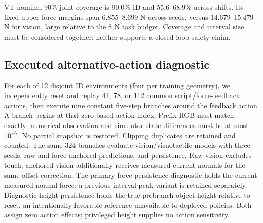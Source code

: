 \documentclass[letterpaper,10pt,conference]{ieeeconf}
\begin{document}
VT nominal-90\% joint coverage is 90.0\% ID and 55.6--68.9\% across shifts. Its fixed upper force margins span 6.855--8.699 N across seeds, versus 14.679--15.479 N for vision, large relative to the 8 N task budget. Coverage and interval size must be considered together; neither supports a closed-loop safety claim.


\subsection{Executed alternative-action diagnostic}
For each of 12 disjoint ID environments (four per training geometry), we
independently reset and replay
44, 78, or 112 common script/force-feedback actions, then execute nine
constant five-step branches around the feedback action. A branch begins
at that zero-based action index. Prefix RGB must match exactly; numerical
observation and simulator-state differences must be at most $10^{-7}$.
No partial snapshot is restored. Clipping duplicates are retained and counted.
The same 324 branches evaluate vision/visuotactile models with three
seeds, raw and force-anchored predictions, and persistence.
Raw vision excludes touch; anchored vision additionally receives measured
current normals for the same offset correction.
The primary force-persistence diagnostic holds the current measured normal
force; a previous-interval-peak variant is retained separately. Diagnostic
height persistence holds the true prebranch object height relative to reset,
an intentionally favorable reference unavailable to deployed policies.
Both assign zero action effects; privileged height supplies no action sensitivity.
\end{document}
